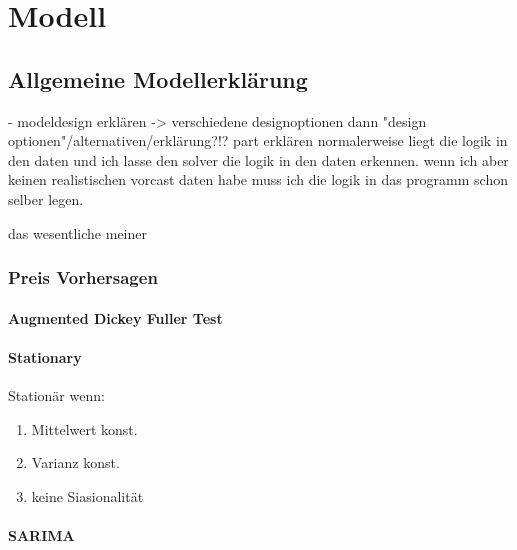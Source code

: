 \chapter{Modell}
\section{Allgemeine Modellerklärung}
- modeldesign erklären
-> verschiedene designoptionen dann "design optionen"/alternativen/erklärung?!? part erklären
normalerweise liegt die logik in den daten und ich lasse den solver die logik in den daten erkennen.
wenn ich aber keinen realistischen vorcast daten habe muss ich die logik in das programm schon selber legen.

das wesentliche meiner


\subsection{Preis Vorhersagen}
\subsubsection{Augmented Dickey Fuller Test}
\subsubsection{Stationary}
Stationär wenn:
\begin{enumerate}
	\item Mittelwert konst.
	\item Varianz konst.
	\item keine Siasionalität
\end{enumerate}
\subsubsection{SARIMA}
